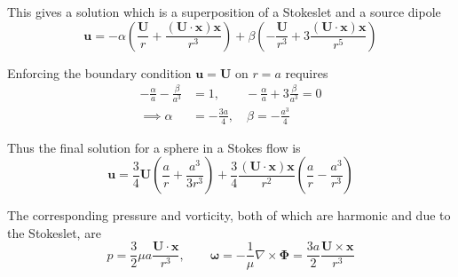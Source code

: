 \documentclass{jknotes}
\newcommand{\x}{\bm{x}}
\begin{document}
This gives a solution which is a superposition of a Stokeslet and a source
dipole
\begin{equation}
	\bm{u} = -\alpha \left( \frac{\bm{U}}{r} +
		\frac{(\bm{U}\cdot\x)\x}{r^3}\right) + \beta \left(
	-\frac{\bm{U}}{r^3} + 3 \frac{(\bm{U}\cdot\x)\x}{r^5}\right)
\end{equation}

Enforcing the boundary condition $\bm{u} = \bm{U}$ on $r=a$ requires
\begin{equation}
	\begin{aligned}
		-\frac{\alpha}{a} - \frac{\beta}{a^3} &= 1, \hspace{2em}
		-\frac{\alpha}{a} + 3 \frac{\beta}{a^3} = 0 \\
		\implies \alpha &= -\frac{3a}{4}, \hspace{1em} \beta = -\frac{a^3}{4}
	\end{aligned}
\end{equation}

Thus the final solution for a sphere in a Stokes flow is
\begin{equation}
	\bm{u} = \frac{3}{4}\bm{U}\left(\frac{a}{r} + \frac{a^3}{3r^3} \right) +
	\frac{3}{4} \frac{(\bm{U}\cdot\x)\x}{r^2} \left( \frac{a}{r} -
	\frac{a^3}{r^3}\right)
\end{equation}

The corresponding pressure and vorticity, both of which are harmonic and due
to the Stokeslet, are
\begin{equation}
	p = \frac{3}{2}\mu a \frac{\bm{U}\cdot\x}{r^3}, \hspace{2em}\bm{\omega} =
	-\frac{1}{\mu} \nabla \times \bm{\Phi} = \frac{3a}{2}\frac{\bm{U} \times
	\bm{x}}{r^3}
\end{equation}

\end{document}
